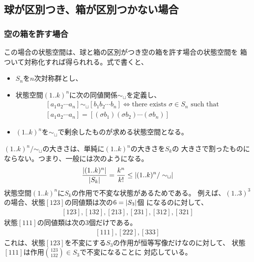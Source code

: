	\subsection{球が区別つき、箱が区別つかない場合}\label{s2:球が区別つき、箱が区別つかない場合} %
		\subsubsection{空の箱を許す場合}\label{s3:空の箱を許す場合} %
			この場合の状態空間は、球と箱の区別がつき空の箱を許す場合の状態空間を
			箱ついて対称化すれば得られれる。式で書くと、
			\begin{itemize}\setlength{\itemsep}{-1mm} %
				\item $S_n$を$n$次対称群とし、
				\item 状態空間$(1..k)^n$に次の同値関係$\sim_{\sqcup}$を定義し、
				\begin{equation*}\begin{split} %
					[a_1a_2\cdots a_n] \sim_{\sqcup} [b_1b_2\cdots b_n]
					\Leftrightarrow \text{there exists }\sigma\in S_n \text{ such that } \\
					[a_1a_2\cdots a_n] = [(\sigma b_1)(\sigma b_2)\cdots (\sigma b_n)]
				\end{split}\end{equation*} %
				\item $(1..k)^n$を$\sim_{\sqcup}$で剰余したものが求める状態空間となる。
			\end{itemize} %
			$(1..k)^n/\sim_{\sqcup}$の大きさは、単純に$(1..k)^n$の大きさを$S_k$の
			大きさで割ったものにならない。つまり、一般には次のようになる。
			\begin{equation*}\begin{split} %
				\frac{\zettai{(1..k)^n}}{\zettai{S_k}} 
				= \frac{k^n}{k!}\le \zettai{(1..k)^n/\sim_{\sqcup}}
			\end{split}\end{equation*} %
			状態空間$(1..k)^n$に$S_k$の作用で不変な状態があるためである。
			例えば、$(1..3)^3$の場合、状態$[123]$の同値類は次の$6=\left|{S_3}\right|$個
			になるのに対して、
			\begin{equation*}\begin{split} %
				[123],[132],[213],[231],[312],[321]
			\end{split}\end{equation*} %
			状態$[111]$の同値類は次の$3$個だけである。
			\begin{equation*}\begin{split} %
				[111],[222],[333]
			\end{split}\end{equation*} %
			これは、状態$[123]$を不変にする$S_3$の作用が恒等写像だけなのに対して、
			状態$[111]$は作用$\binom{123}{132}\in S_3$で不変になることに
			対応している。

